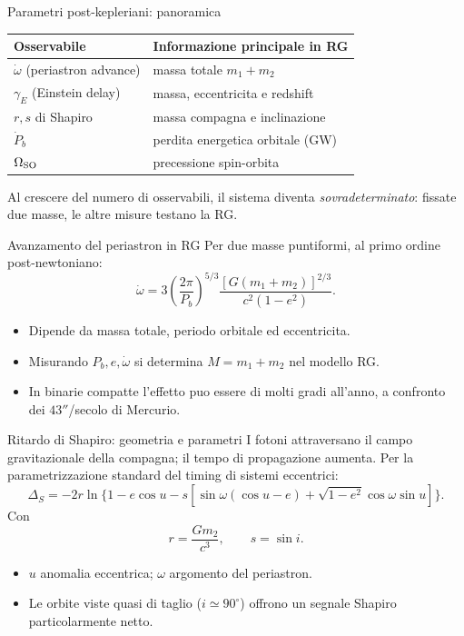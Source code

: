 \begin{frame}[t]{Parametri post-kepleriani: panoramica}
\small
\begin{tabular}{@{}ll@{}}
\toprule
Osservabile & Informazione principale in RG \\
\midrule
$\dot\omega$ (periastron advance) & massa totale $m_1+m_2$ \\
$\gamma_E$ (Einstein delay) & massa, eccentricita e redshift \\
$r,s$ di Shapiro & massa compagna e inclinazione \\
$\dot P_b$ & perdita energetica orbitale (GW) \\
$\Omega_{\rm SO}$ & precessione spin-orbita \\
\bottomrule
\end{tabular}
\medskip
Al crescere del numero di osservabili, il sistema diventa \emph{sovradeterminato}: fissate due masse, le altre misure testano la RG.
\end{frame}

\begin{frame}[t]{Avanzamento del periastron in RG}
\small
Per due masse puntiformi, al primo ordine post-newtoniano:
\[
\dot\omega=3\left(\frac{2\pi}{P_b}\right)^{5/3}
\frac{[G(m_1+m_2)]^{2/3}}{c^2(1-e^2)}.
\]
\begin{itemize}
\item Dipende da massa totale, periodo orbitale ed eccentricita.
\item Misurando $P_b,e,\dot\omega$ si determina $M=m_1+m_2$ nel modello RG.
\item In binarie compatte l'effetto puo essere di molti gradi all'anno, a confronto dei $43''$/secolo di Mercurio.
\end{itemize}
\end{frame}

\begin{frame}[t]{Ritardo di Shapiro: geometria e parametri}
\small
I fotoni attraversano il campo gravitazionale della compagna; il tempo di propagazione aumenta.
Per la parametrizzazione standard del timing di sistemi eccentrici:
\[
\Delta_S=-2r\ln\{1-e\cos u
-s[\sin\omega(\cos u-e)+\sqrt{1-e^2}\cos\omega\sin u]\}.
\]
Con
\[
r=\frac{Gm_2}{c^3},\qquad s=\sin i.
\]
\begin{itemize}
\item $u$ anomalia eccentrica; $\omega$ argomento del periastron.
\item Le orbite viste quasi di taglio ($i\simeq90^\circ$) offrono un segnale Shapiro particolarmente netto.
\end{itemize}
\end{frame}

